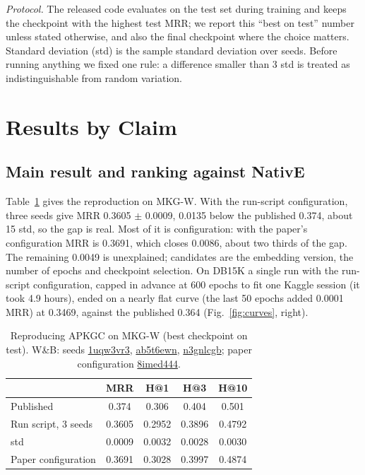 \documentclass[conference,a4paper]{IEEEtran}
\newcommand{\wb}[2]{\href{https://wandb.ai/nhantrnh-graphml/#1}{{\normalfont\ttfamily #2}}}
\begin{document}
\emph{Protocol.} The released code evaluates on the test set during training and keeps
the checkpoint with the highest test MRR; we report this ``best on test'' number unless
stated otherwise, and also the final checkpoint where the choice matters. Standard
deviation (std) is the sample standard deviation over seeds. Before running anything we
fixed one rule: a difference smaller than 3 std is treated as indistinguishable from
random variation.

\section{Results by Claim}
\subsection{Main result and ranking against NativE}
\label{sec:c1}
Table~\ref{tab:repro} gives the reproduction on MKG-W. With the run-script configuration,
three seeds give MRR 0.3605 $\pm$ 0.0009, 0.0135 below the published 0.374, about 15 std,
so the gap is real. Most of it is configuration: with the paper's configuration MRR is
0.3691, which closes 0.0086, about two thirds of the gap. The remaining 0.0049 is
unexplained; candidates are the embedding version, the number of epochs and checkpoint
selection. On DB15K a single run with the run-script configuration, capped in advance at 600 epochs
to fit one Kaggle session (it took 4.9 hours), ended on a nearly flat curve (the last 50
epochs added 0.0001 MRR) at 0.3469, against the published 0.364 (Fig.~\ref{fig:curves},
right).

\begin{table}[!t]
\centering
\caption{Reproducing APKGC on MKG-W (best checkpoint on test). W\&B: seeds \wb{apkgc-repro/runs/1uqw3vr3}{1uqw3vr3}, \wb{apkgc-repro/runs/ab5t6ewn}{ab5t6ewn}, \wb{apkgc-repro/runs/n3gnlcgb}{n3gnlcgb}; paper configuration \wb{apkgc-repro/runs/8imed444}{8imed444}.}
\label{tab:repro}
\small
\setlength{\tabcolsep}{4pt}
\begin{tabular}{lcccc}
\toprule
 & MRR & H@1 & H@3 & H@10\\
\midrule
Published~\cite{apkgc} & 0.374 & 0.306 & 0.404 & 0.501\\
Run script, 3 seeds & 0.3605 & 0.2952 & 0.3896 & 0.4792\\
\quad std & 0.0009 & 0.0032 & 0.0028 & 0.0030\\
Paper configuration & 0.3691 & 0.3028 & 0.3997 & 0.4874\\
\bottomrule
\end{tabular}
\end{table}
\end{document}
